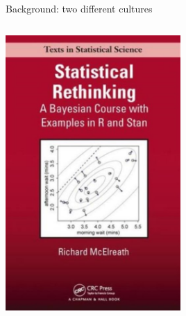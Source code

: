 \documentclass{beamer}
\begin{document}
\begin{frame}{Background: two different cultures \citep{breiman2001statistical}}
\begin{columns}
\begin{column}{0.5\textwidth}
\begin{center}
			\includegraphics[width=0.5\textwidth]{../fig/rethinking}      
		\end{center}
	\end{column}
\end{columns}
\end{frame}
\end{document}
